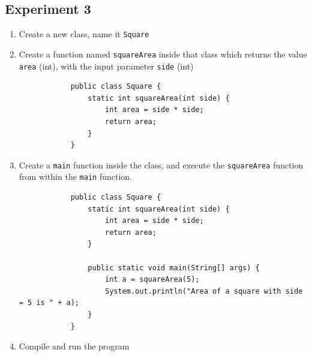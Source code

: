 \documentclass[12pt,titlepage]{article}
\begin{document}
\subsection{Experiment 3}
\begin{enumerate}
    \item Create a new class, name it \texttt{Square}
    \item {
        Create a function named \texttt{squareArea} inside that class which returns the value
        \texttt{area} (int), with the input parameter \texttt{side} (int)

        \begin{verbatim}
            public class Square {
                static int squareArea(int side) {
                    int area = side * side;
                    return area;
                }
            }
        \end{verbatim}
    }
    \item {
        Create a \texttt{main} function inside the class, and execute the \texttt{squareArea}
        function from within the \texttt{main} function.

        \begin{verbatim}
            public class Square {
                static int squareArea(int side) {
                    int area = side * side;
                    return area;
                }

                public static void main(String[] args) {
                    int a = squareArea(5);
                    System.out.println("Area of a square with side = 5 is " + a);
                }
            }
        \end{verbatim}
    }
    \item Compile and run the program
\end{enumerate}
\end{document}
